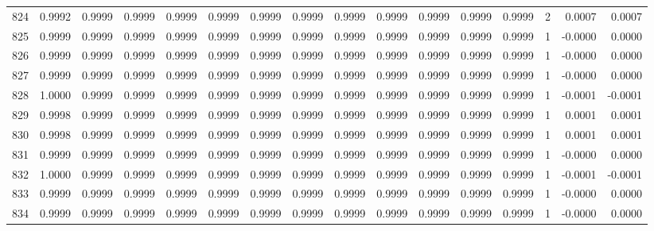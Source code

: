 \begin{tabular}{lrrrrrrrrrrrrrrr}
824 &      0.9992 &  0.9999 &  0.9999 &  0.9999 &  0.9999 &  0.9999 &  0.9999 &  0.9999 &  0.9999 &  0.9999 &   0.9999 &     0.9999 &      2 &                    0.0007 &                     0.0007 \\
825 &      0.9999 &  0.9999 &  0.9999 &  0.9999 &  0.9999 &  0.9999 &  0.9999 &  0.9999 &  0.9999 &  0.9999 &   0.9999 &     0.9999 &      1 &                   -0.0000 &                     0.0000 \\
826 &      0.9999 &  0.9999 &  0.9999 &  0.9999 &  0.9999 &  0.9999 &  0.9999 &  0.9999 &  0.9999 &  0.9999 &   0.9999 &     0.9999 &      1 &                   -0.0000 &                     0.0000 \\
827 &      0.9999 &  0.9999 &  0.9999 &  0.9999 &  0.9999 &  0.9999 &  0.9999 &  0.9999 &  0.9999 &  0.9999 &   0.9999 &     0.9999 &      1 &                   -0.0000 &                     0.0000 \\
828 &      1.0000 &  0.9999 &  0.9999 &  0.9999 &  0.9999 &  0.9999 &  0.9999 &  0.9999 &  0.9999 &  0.9999 &   0.9999 &     0.9999 &      1 &                   -0.0001 &                    -0.0001 \\
829 &      0.9998 &  0.9999 &  0.9999 &  0.9999 &  0.9999 &  0.9999 &  0.9999 &  0.9999 &  0.9999 &  0.9999 &   0.9999 &     0.9999 &      1 &                    0.0001 &                     0.0001 \\
830 &      0.9998 &  0.9999 &  0.9999 &  0.9999 &  0.9999 &  0.9999 &  0.9999 &  0.9999 &  0.9999 &  0.9999 &   0.9999 &     0.9999 &      1 &                    0.0001 &                     0.0001 \\
831 &      0.9999 &  0.9999 &  0.9999 &  0.9999 &  0.9999 &  0.9999 &  0.9999 &  0.9999 &  0.9999 &  0.9999 &   0.9999 &     0.9999 &      1 &                   -0.0000 &                     0.0000 \\
832 &      1.0000 &  0.9999 &  0.9999 &  0.9999 &  0.9999 &  0.9999 &  0.9999 &  0.9999 &  0.9999 &  0.9999 &   0.9999 &     0.9999 &      1 &                   -0.0001 &                    -0.0001 \\
833 &      0.9999 &  0.9999 &  0.9999 &  0.9999 &  0.9999 &  0.9999 &  0.9999 &  0.9999 &  0.9999 &  0.9999 &   0.9999 &     0.9999 &      1 &                   -0.0000 &                     0.0000 \\
834 &      0.9999 &  0.9999 &  0.9999 &  0.9999 &  0.9999 &  0.9999 &  0.9999 &  0.9999 &  0.9999 &  0.9999 &   0.9999 &     0.9999 &      1 &                   -0.0000 &                     0.0000 \\

\end{tabular}
